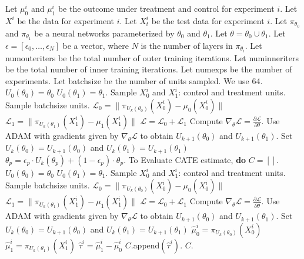 \newpage

\begin{algorithm}[H]
\caption{SF Reptile T-learner}
\label{alg:sf-reptile-t}
\begin{algorithmic}[1]
\STATE Let $\mu_0^i$ and $\mu_1^i$ be the outcome under treatment and control for experiment $i$. 
\STATE Let $X^i$ be the data for experiment $i$. Let $X^i_t$ be the test data for experiment $i$. 
\STATE Let $\pi_{\theta_0}$ and $\pi_{\theta_1}$ be a neural networks parameterized by $\theta_0$ and $\theta_1$. 
\STATE Let $\theta = \theta_0 \cup \theta_1$. 
\STATE Let $\epsilon = \left[\epsilon_0, \dots, \epsilon_N \right]$ be a vector, where $N$ is the number of layers in $\pi_{\theta_i}$. 
\STATE Let numouteriters be the total number of outer training iterations.
\STATE Let numinneriters be the total number of inner training iterations. 
\STATE Let numexps be the number of experiments. 
\STATE Let batchsize be the number of units sampled. We use 64. 
\STATE $U_0(\theta_0) = \theta_0$ 
\STATE $U_0(\theta_1) = \theta_1$. 
\STATE Sample $X_0^i$ and $X_1^i$: control and treatment units. Sample batchsize units.  
\STATE $\mathcal{L}_0= \| \pi_{U_k(\theta_0)} (X_0^i) - \mu_0(X_0^i) \| $
\STATE $\mathcal{L}_1 = \| \pi_{U_k(\theta_1)} (X_1^i) - \mu_1(X_1^i) \| $
\STATE $\mathcal{L} = \mathcal{L}_0 + \mathcal{L}_1$
\STATE Compute $\nabla_{\theta} \mathcal{L} = \frac{\partial \mathcal{L}}{\partial \theta}$.
\STATE Use ADAM with gradients given by $\nabla_{\theta} \mathcal{L}$ to obtain $U_{k+1}(\theta_0)$ and $U_{k+1}(\theta_1)$. 
\STATE Set $U_{k}(\theta_0)=U_{k+1}(\theta_0)$ and $U_{k}(\theta_1) = U_{k+1}(\theta_1)$
\ENDFOR
{}
\STATE $\theta_p = \epsilon_p \cdot U_k(\theta_p) + (1 - \epsilon_p) \cdot \theta_p$.  
\ENDFOR
\ENDFOR
\ENDFOR
\STATE To Evaluate CATE estimate, \textbf{do}
\STATE $C = []$. 
\STATE $U_0(\theta_0) = \theta_0$ 
\STATE $U_0(\theta_1) = \theta_1$. 
\STATE Sample $X_0^i$ and $X_1^i$: control and treatment units. Sample batchsize units.  
\STATE $\mathcal{L}_0= \| \pi_{U_k(\theta_0)} (X_0^i) - \mu_0(X_0^i) \| $
\STATE $\mathcal{L}_1 = \| \pi_{U_k(\theta_1)} (X_1^i) - \mu_1(X_1^i) \| $
\STATE $\mathcal{L} = \mathcal{L}_0 + \mathcal{L}_1$
\STATE Compute $\nabla_{\theta} \mathcal{L} = \frac{\partial \mathcal{L}}{\partial \theta}$.
\STATE Use ADAM with gradients given by $\nabla_{\theta} \mathcal{L}$ to obtain $U_{k+1}(\theta_0)$ and $U_{k+1}(\theta_1)$. 
\STATE Set $U_{k}(\theta_0)=U_{k+1}(\theta_0)$ and $U_{k}(\theta_1) = U_{k+1}(\theta_1)$
\ENDFOR
\STATE $\hat{\mu}_0^i = \pi_{U_k(\theta_0)}(X_0^i)$
\STATE $\hat{\mu}_1^i = \pi_{U_k(\theta_1)}(X_1^i)$
\STATE $\hat{\tau}^i =  \hat{\mu}_1^i - \hat{\mu}_0^i$
\STATE $C.$append$(\hat{\tau}^i)$. 
\ENDFOR
{} $C$. 
\end{algorithmic}
\end{algorithm}



